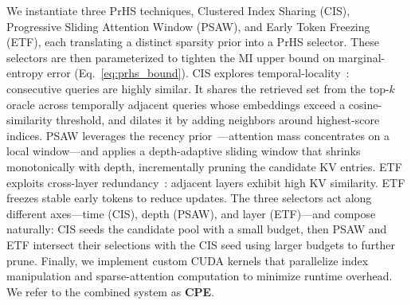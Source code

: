 We instantiate three PrHS techniques, Clustered Index Sharing (CIS), Progressive Sliding Attention Window (PSAW), and Early Token Freezing (ETF), each translating a distinct sparsity prior into a PrHS selector. These selectors are then parameterized to tighten the MI upper bound on marginal-entropy error (Eq.~\eqref{eq:prhs_bound}). CIS explores temporal-locality~\cite{wuhshare}: consecutive queries are highly similar. It shares the retrieved set from the top-$k$ oracle across temporally adjacent queries whose embeddings exceed a cosine-similarity threshold, and dilates it by adding neighbors around highest-score indices. PSAW leverages the recency prior~\cite{xiao2023streamingllm,zhang2023h2o}—attention mass concentrates on a local window—and applies a depth-adaptive sliding window that shrinks monotonically with depth, incrementally pruning the candidate KV entries. ETF exploits cross-layer redundancy~\cite{liu2405minicache}: adjacent layers exhibit high KV similarity. ETF freezes stable early tokens to reduce updates. The three selectors act along different axes—time (CIS), depth (PSAW), and layer (ETF)—and compose naturally: CIS seeds the candidate pool with a small budget, then PSAW and ETF intersect their selections with the CIS seed using larger budgets to further prune. Finally, we implement custom CUDA kernels that parallelize index manipulation and sparse-attention computation to minimize runtime overhead. We refer to the combined system as \textbf{CPE}. 



